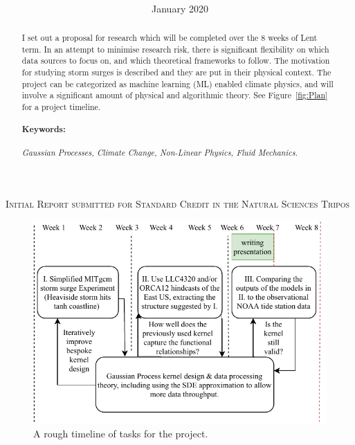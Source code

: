 \documentclass[usenames, dvipsnames, twocolumn]{article}
\date{January 2020}
\title{\vspace*{-100pt}\textbf{\mytitle}\vspace{-10pt}}
\author{\penname \\  \supervisor }
\begin{document}
  \begin{@twocolumnfalse}
    \vspace{-25pt}
  \maketitle
  \setcounter{page}{1}
    \textsc{Initial Report submitted for Standard Credit in
the Natural Sciences Tripos}
    \begin{abstract}
     I set out a proposal for research which will be completed over the 8 weeks of Lent term.
     In an attempt to minimise research risk, there is significant flexibility on which data sources to focus on,
      and which theoretical frameworks to follow.
      The motivation for studying storm surges is described and they are put in their physical context.
      The project can be categorized as machine learning (ML) enabled climate physics,
       and will involve a significant amount of physical and algorithmic theory.
       See Figure~\ref{fig:Plan} for a project timeline.

\paragraph{Keywords:} \textit{Gaussian Processes, Climate Change,
 Non-Linear Physics, Fluid Mechanics.}
    \vspace{20pt}
    \end{abstract}

  \end{@twocolumnfalse}
\vspace{-30pt}
\noindent
\begin{figure}[htb!]
    \centering
    \includegraphics[width=\linewidth]{images/proposal/PartIIIProjPlan.pdf}
    \caption{A rough timeline of tasks for the project.}
    \label{fig:Plan}
\end{figure}
\end{document}
